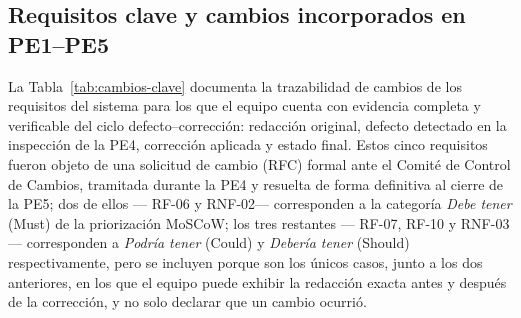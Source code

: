 \documentclass[journal,onecolumn]{IEEEtran}
\begin{document}
\subsection{Requisitos clave y cambios incorporados en PE1--PE5}
\label{sec:cambios-pe1-pe5}

La Tabla~\ref{tab:cambios-clave} documenta la trazabilidad de cambios de los
requisitos del sistema para los que el equipo cuenta con evidencia completa y
verificable del ciclo defecto--corrección: redacción original, defecto
detectado en la inspección de la PE4, corrección aplicada y estado final.
Estos cinco requisitos fueron objeto de una solicitud de cambio (RFC) formal
ante el Comité de Control de Cambios, tramitada durante la PE4 y resuelta de
forma definitiva al cierre de la PE5; dos de ellos --- RF-06 y RNF-02---
corresponden a la categoría \emph{Debe tener} (Must) de la priorización
MoSCoW; los tres restantes --- RF-07, RF-10 y RNF-03--- corresponden a
\emph{Podría tener} (Could) y \emph{Debería tener} (Should)
respectivamente, pero se incluyen porque son los únicos casos, junto a los
dos anteriores, en los que el equipo puede exhibir la redacción exacta antes
y después de la corrección, y no solo declarar que un cambio ocurrió.
\end{document}
